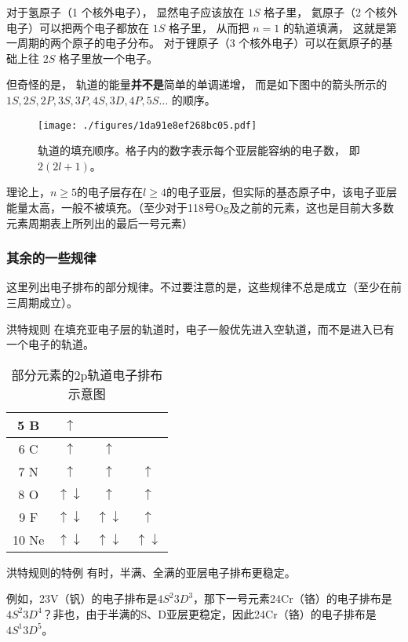 对于氢原子（1 个核外电子）， 显然电子应该放在 $1S$ 格子里， 氦原子（2 个核外电子）可以把两个电子都放在 $1S$ 格子里， 从而把 $n=1$ 的轨道填满， 这就是第一周期的两个原子的电子分布。 对于锂原子（3 个核外电子）可以在氦原子的基础上往 $2S$ 格子里放一个电子。 

但奇怪的是， 轨道的能量\textbf{并不是}简单的单调递增， 而是如下图中的箭头所示的 $1S, 2S, 2P, 3S, 3P, 4S, 3D, 4P, 5S\dots$ 的顺序。 
\begin{figure}[ht]
\centering
\texttt{[image: ./figures/1da91e8ef268bc05.pdf]}
\caption{轨道的填充顺序。格子内的数字表示每个亚层能容纳的电子数， 即 $2(2l + 1)$。} \label{fig_Ptable_2}
\end{figure}


理论上，$n\ge5$的电子层存在$l\ge4$的电子亚层，但实际的基态原子中，该电子亚层能量太高，一般不被填充。（至少对于118号Og及之前的元素，这也是目前大多数元素周期表上所列出的最后一号元素）

\subsubsection{其余的一些规律}
这里列出电子排布的部分规律。不过要注意的是，这些规律不总是成立（至少在前三周期成立）。

\begin{theorem}{洪特规则}
在填充亚电子层的轨道时，电子一般优先进入空轨道，而不是进入已有一个电子的轨道。
\end{theorem}

\begin{table}[ht]
\centering
\caption{部分元素的2p轨道电子排布示意图}\label{tab_Ptable_2}
\begin{tabular}{|c|c|c|c|}
\hline
5 B & $\uparrow$ &  & \\
\hline
6 C & $\uparrow$ & $\uparrow$& \\
\hline
7 N & $\uparrow$ & $\uparrow$&$\uparrow$ \\
\hline
8 O & $\uparrow \downarrow$ & $\uparrow$ & $\uparrow$ \\
\hline
9 F & $\uparrow \downarrow$ & $\uparrow \downarrow$ & $\uparrow$ \\
\hline
10 Ne & $\uparrow \downarrow$ & $\uparrow \downarrow$ & $\uparrow \downarrow$ \\
\hline
\end{tabular}
\end{table}

\begin{theorem}{洪特规则的特例}
有时，半满、全满的亚层电子排布更稳定。
\end{theorem}
例如，23V（钒）的电子排布是$4S^2 3D^3$，那下一号元素24Cr（铬）的电子排布是$4S^2 3D^4$？非也，由于半满的S、D亚层更稳定，因此24Cr（铬）的电子排布是$4S^1 3D^5$。

